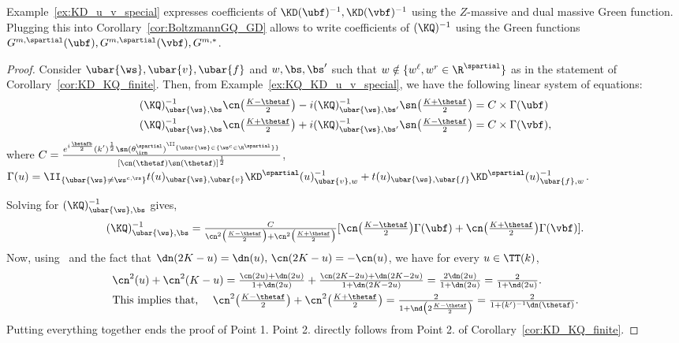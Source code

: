 \documentclass[a4paper,twoside,11pt]{article}
\begin{document}
\begin{rem}\label{rem:final_0}
Example~\ref{ex:KD_u_v_special} expresses coefficients of $\KD(\ubf)^{-1}, \KD(\vbf)^{-1}$ using the 
$Z$-massive and dual massive Green function. Plugging this into Corollary~\ref{cor:BoltzmannGQ_GD} allows to 
write coefficients of $(\KQ)^{-1}$ using the Green functions $G^{m,\spartial}(\ubf),G^{m,\spartial}(\vbf),G^{m,*}$.
\end{rem}


\begin{proof}
Consider $\ubar{\ws},\ubar{v},\ubar{f}$ and $w,\bs,\bs'$ such that $w\notin\{w^\ell,w^r\in\R^\spartial\}$ as in the statement of Corollary~\ref{cor:KD_KQ_finite}. Then,
from Example~\ref{ex:KQ_KD_u_v_special}, we have the following linear system of equations: 
\begin{align*}
&\textstyle
(\KQ)^{-1}_{\ubar{\ws},\bs}\cn\bigl(\frac{K-\thetaf}{2}\bigr)-i\textstyle (\KQ)^{-1}_{\ubar{\ws},\bs'}\sn\bigl(\frac{K+\thetaf}{2}\bigr)
=C\times 
\Gamma(\ubf)\\
&\textstyle
(\KQ)^{-1}_{\ubar{\ws},\bs}\cn\bigl(\frac{K+\thetaf}{2}\bigr)+i\textstyle (\KQ)^{-1}_{\ubar{\ws},\bs'}\sn\bigl(\frac{K-\thetaf}{2}\bigr)
=C\times 
\Gamma(\vbf),
\end{align*}
where $C=\frac{e^{i\frac{\betafb}{2}}(k')^{\frac{1}{2}}\sn(\theta^{\spartial}_\irm)^{\II_{\{\ubar{\ws}\in\{\ws^c\in\R^\spartial\}\}}}}{
[\cn(\thetaf)\sn(\thetaf)]^{\frac{1}{2}}}$,
$\Gamma(u)=\II_{\{\ubar{\ws}\neq \ws^{c,\rs}\}}
t(u)_{\ubar{\ws},\ubar{v}}\KD^\spartial(u)^{-1}_{\ubar{v},w}+t(u)_{\ubar{\ws},\ubar{f}}\KD^\spartial(u)^{-1}_{\ubar{f},w}$.

Solving for $(\KQ)^{-1}_{\ubar{\ws},\bs}$ gives,
\begin{equation*}
\textstyle
(\KQ)^{-1}_{\ubar{\ws},\bs}=\frac{C}{\cn^2\bigl(\frac{K-\thetaf}{2}\bigr)+\cn^2\bigl(\frac{K+\thetaf}{2}\bigr)}
[\cn\bigl(\frac{K-\thetaf}{2}\bigr)\Gamma(\ubf)+ \cn\bigl(\frac{K+\thetaf}{2}\bigr)\Gamma(\vbf)].
\end{equation*}
Now, using~\cite[2.4.8]{Lawden} and the fact that $\dn(2K-u)=\dn(u),\, \cn(2K-u)=-\cn(u)$, we have for every $u\in\TT(k)$,
\begin{align}
\textstyle 
&\cn^2(u)+\cn^2(K-u)=\textstyle \frac{\cn(2u)+\dn(2u)}{1+\dn(2u)}+\frac{\cn(2K-2u)+\dn(2K-2u)}{1+\dn(2K-2u)}=\frac{2\dn(2u)}{1+\dn(2u)}
=\frac{2}{1+\nd(2u)}.\nonumber\\
&\text{This implies that, } \quad 
\textstyle
\cn^2\bigl(\frac{K-\thetaf}{2}\bigr)+\cn^2\bigl(\frac{K+\thetaf}{2}\bigr)=\frac{2}{1+\nd\bigl(2\frac{K-\thetaf}{2}\bigr)}
=\frac{2}{1+(k')^{-1}\dn(\thetaf)}.\label{equ:id_somme_cn_carre}
\end{align}
Putting everything together ends the proof of Point 1. Point 2. directly follows from Point 2. of Corollary~\ref{cor:KD_KQ_finite}.
\end{proof}
\end{document}
